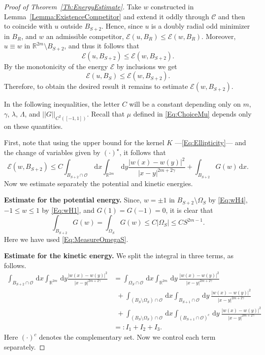 \documentclass[12pt,reqno]{amsart}
\theoremstyle{definition}
\theoremstyle{remark}
\newcommand{\con}[1]{\mathbb{#1}}
\newcommand{\R}{\con{R}} %
\newcommand{\ccal}{\mathscr{C}}
\newcommand{\ecal}{\mathcal{E}}
\newcommand{\ocal}{\mathcal{O}}
\newcommand{\norm}[1]{\left | \left |{#1} \right | \right |}
\newcommand{\s}{\gamma}
\renewcommand{\d}{\,\mathrm{d}} %
\numberwithin{equation}{section}
\begin{document}
\begin{proof}[Proof of Theorem~\ref{Th:EnergyEstimate}]
	Take $w$ constructed in Lemma~\ref{Lemma:ExistenceCompetitor} and extend it oddly through $\ccal$ and then to coincide with $u$ outside $B_{S+2}$.  Hence, since $u$ is a doubly radial odd minimizer in $B_R$, and $w$ an admissible competitor, $\ecal (u, B_R) \leq \ecal (w, B_R)$. Moreover, $u\equiv w$ in $\R^{2m}\setminus B_{S+2}$, and thus it follows that
	$$ 
	\ecal (u, B_{S+2}) \leq \ecal (w, B_{S+2}).
	$$
	By the monotonicity of the energy $\ecal$ by inclusions we get
	$$ 
	\ecal (u, B_{S}) \leq \ecal (w, B_{S+2}). 
	$$
	Therefore, to obtain the desired result it remains to estimate $\ecal (w, B_{S+2})$. 
	
	
	In the following inequalities, the letter $C$ will be a constant depending only on $m$, $\s$, $\lambda$, $\Lambda$, and $\norm{G}_{C^2([-1,1])}$. Recall that $\mu$ defined in \eqref{Eq:ChoiceMu} depends only on these quantities.
	
	First, note that using the upper bound for the kernel $K$ ---\eqref{Eq:Ellipticity}--- and the change of variables given by $(\cdot)^\star$, it follows that
	$$ 
	\ecal(w,B_{S+2}) \leq C \int_{B_{S+2}\cap \ocal} \d x \int_{\R^{2m}} \d y \frac{|w(x)-w(y)|^2}{|x-y|^{2m+2\s}} + \int_{B_{S+2}} G(w) \d x. 
	$$
	Now we estimate separately the potential and kinetic energies.
	
	\medskip
	
	\textbf{Estimate for the potential energy.}
	Since, $w=\pm 1$ in $B_{S+2} \setminus \Omega_S$ by \eqref{Eq:wH4}, $-1\leq w\leq 1$ by \eqref{Eq:wH1}, and $G(1) = G(-1) = 0$, it is clear that
	$$ 
	\int_{B_{S+2}} G(w) = \int_{\Omega_S} G(w) \leq C |\Omega_S| \leq C S^{2m-1}.
	$$  
	Here we have used \eqref{Eq:MeasureOmegaS}.
	
	\medskip
	
	\textbf{Estimate for the kinetic energy.}
	We split the integral in three terms, as follows.
	\begin{align*}
	\int_{B_{S+2}\cap \ocal} \d x \int_{\R^{2m}} \d y \frac{|w(x)-w(y)|^2}{|x-y|^{2m+2\s}} &= \int_{\Omega_{S}\cap \ocal} \d x \int_{\R^{2m}} \d y \ \frac{|w(x)-w(y)|^2}{|x-y|^{2m+2\s}} \\
	&\ \ + \int_{(B_S\setminus \Omega_S)\cap \ocal} \d x \int_{B_{S+1}\cap \ocal} \d y \ \frac{|w(x)-w(y)|^2}{|x-y|^{2m+2\s}} \\
	&\ \ + \int_{(B_S\setminus \Omega_S)\cap \ocal} \d x \int_{(B_{S+1}\cap \ocal)^c} \d y \ \frac{|w(x)-w(y)|^2}{|x-y|^{2m+2\s}} \\
	&=: I_1+I_2+I_3.
	\end{align*}
	Here $(\cdot)^c$ denotes the complementary set. Now we control each term separately.
	

\end{proof}
\end{document}
